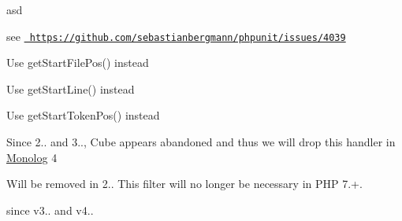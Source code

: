 \begin{DoxyRefList}
\item[Class \mbox{\hyperlink{class_checking___tags}{Checking\+\_\+\+Tags}} ]\label{deprecated__deprecated000078}%
%
asd  
\item[Global \mbox{\hyperlink{class_p_h_p_unit_1_1_text_u_i_1_1_command_a734434b4fd6fb4a91122ff038effc43e}{Command\+::handle\+Loader}} (string \$loader\+Class, string \$loader\+File=\textquotesingle{}\textquotesingle{})]\label{deprecated__deprecated000063}%
%
see \href{https://github.com/sebastianbergmann/phpunit/issues/4039}{\texttt{ https\+://github.\+com/sebastianbergmann/phpunit/issues/4039}}  
\item[Global \mbox{\hyperlink{class_php_parser_1_1_comment_a1694934673e29c561ce99f4486a3fbb2}{Comment\+::get\+File\+Pos}} ()]\label{deprecated__deprecated000010}%
%
Use get\+Start\+File\+Pos() instead 
\item[Global \mbox{\hyperlink{class_php_parser_1_1_comment_aef9c32f6066788a101028a1d4150f8cb}{Comment\+::get\+Line}} ()]\label{deprecated__deprecated000009}%
%
Use get\+Start\+Line() instead 
\item[Global \mbox{\hyperlink{class_php_parser_1_1_comment_a8a28cd96a677821a2fb84a3362a2214e}{Comment\+::get\+Token\+Pos}} ()]\label{deprecated__deprecated000011}%
%
Use get\+Start\+Token\+Pos() instead 
\item[Class \mbox{\hyperlink{class_monolog_1_1_handler_1_1_cube_handler}{Cube\+Handler}} ]\label{deprecated__deprecated000003}%
%
Since 2.. and 3.., Cube appears abandoned and thus we will drop this handler in \mbox{\hyperlink{namespace_monolog}{Monolog}} 4  
\item[Class \mbox{\hyperlink{class_deep_copy_1_1_type_filter_1_1_date_1_1_date_interval_filter}{Date\+Interval\+Filter}} ]\label{deprecated__deprecated000006}%
%
Will be removed in 2.. This filter will no longer be necessary in PHP 7.+.  
\item[Class \mbox{\hyperlink{class_sebastian_bergmann_1_1_comparator_1_1_double_comparator}{Double\+Comparator}} ]\label{deprecated__deprecated000074}%
%
since v3.. and v4..  
\item[Global \mbox{\hyperlink{class_sebastian_bergmann_1_1_code_coverage_1_1_driver_1_1_driver_a6d5d4732eb6d0d611010d6d2361263ff}{Driver\+::for\+Line\+And\+Path\+Coverage}} (\mbox{\hyperlink{class_sebastian_bergmann_1_1_code_coverage_1_1_filter}{Filter}} \$filter)]\label{deprecated__deprecated000026}%

\end{DoxyRefList}
